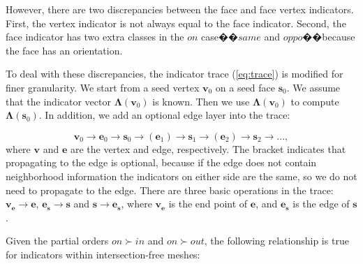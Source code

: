 However, there are two discrepancies between the face and face vertex indicators. First, the vertex indicator is not always equal to the face indicator. Second, the face indicator has two extra classes in the $on$ case��$same$ and $oppo$��because the face has an orientation.


To deal with these discrepancies, the indicator trace (\ref{eq:trace}) is modified for finer granularity. We start from a seed vertex $\bm{v}_0$ on a seed face $\bm{s}_0$. We assume that the indicator vector $\bm{\Lambda}(\bm{v}_0)$ is known. Then we use $\bm{\Lambda}(\bm{v}_0)$ to compute $\bm{\Lambda}(\bm{s}_0)$. In addition, we add an optional edge layer into the trace:

\begin{equation}
\bm{v}_0\to \bm{e}_0\to \bm{s}_0\to (\bm{e}_1)\to \bm{s}_1\to (\bm{e}_2)\to \bm{s}_2\to ...,
\end{equation}
where $\bm{v}$ and $\bm{e}$ are the vertex and edge, respectively. The bracket indicates that propagating to the edge is optional, because if the edge does not contain neighborhood information the indicators on either side are the same, so we do not need to propagate to the edge. There are three basic operations in the trace: $\bm{v}_{\bm{e}}\to \bm{e}$, $\bm{e}_{\bm{s}}\to \bm{s}$ and $\bm{s}\to \bm{e}_{\bm{s}}$, where $\bm{v}_{\bm{e}}$ is the end point of $\bm{e}$, and $\bm{e}_{\bm{s}}$ is the edge of $\bm{s}$.

Given the partial orders $on \succ in$ and $on \succ out$, the following relationship is true for indicators within intersection-free meshes:

